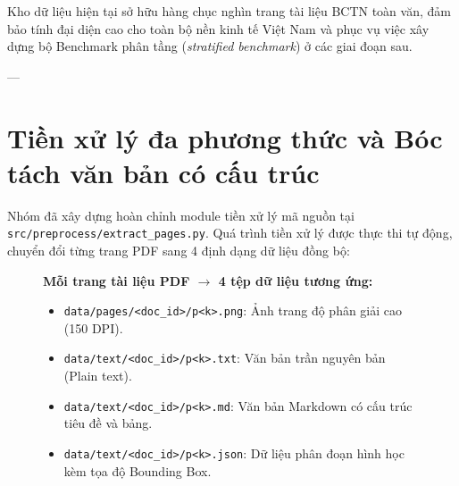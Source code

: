 \documentclass[a4paper,12pt]{article}
\begin{document}
\begin{highlightbox}
    Kho dữ liệu hiện tại sở hữu hàng chục nghìn trang tài liệu BCTN toàn văn, đảm bảo tính đại diện cao cho toàn bộ nền kinh tế Việt Nam và phục vụ việc xây dựng bộ Benchmark phân tầng (\textit{stratified benchmark}) ở các giai đoạn sau.
\end{highlightbox}

---

\section{Tiền xử lý đa phương thức và Bóc tách văn bản có cấu trúc}

Nhóm đã xây dựng hoàn chỉnh module tiền xử lý mã nguồn tại \texttt{src/preprocess/extract\_pages.py}. Quá trình tiền xử lý được thực thi tự động, chuyển đổi từng trang PDF sang 4 định dạng dữ liệu đồng bộ:

\begin{figure}[htbp]
    \centering
    \begin{tcolorbox}[colback=white, colframe=gray!50!black, width=0.95\textwidth, arc=1mm]
        \small
        \textbf{Mỗi trang tài liệu PDF $\longrightarrow$ 4 tệp dữ liệu tương ứng:}
        \begin{itemize}[noitemsep]
            \item \texttt{data/pages/<doc\_id>/p<k>.png}: Ảnh trang độ phân giải cao (150 DPI).
            \item \texttt{data/text/<doc\_id>/p<k>.txt}: Văn bản trần nguyên bản (Plain text).
            \item \texttt{data/text/<doc\_id>/p<k>.md}: Văn bản Markdown có cấu trúc tiêu đề và bảng.
            \item \texttt{data/text/<doc\_id>/p<k>.json}: Dữ liệu phân đoạn hình học kèm tọa độ Bounding Box.
        \end{itemize}
    \end{tcolorbox}
\end{figure}
\end{document}
